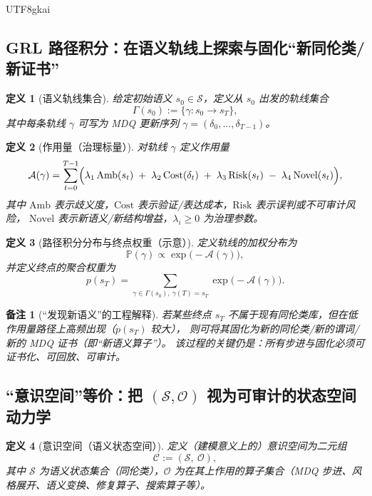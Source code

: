 \documentclass[12pt]{article}
\newtheorem{definition}{定义}[section]
\newtheorem{remark}{备注}[section]
\begin{document}
\begin{CJK*}{UTF8}{gkai}
\subsection{GRL 路径积分：在语义轨线上探索与固化“新同伦类/新证书”}
\label{subsec:grl-path-integral}

\begin{definition}[语义轨线集合]
给定初始语义 $s_0\in\mathcal{S}$，定义从 $s_0$ 出发的轨线集合
\[
\Gamma(s_0):=\{\gamma: s_0\to s_T\},
\]
其中每条轨线 $\gamma$ 可写为 MDQ 更新序列 $\gamma=(\delta_0,\ldots,\delta_{T-1})$。
\end{definition}

\begin{definition}[作用量（治理标量）]
对轨线 $\gamma$ 定义作用量
\[
\mathcal{A}(\gamma)=\sum_{t=0}^{T-1}\Bigl(
\lambda_1\,\mathrm{Amb}(s_t)
\;+\;
\lambda_2\,\mathrm{Cost}(\delta_t)
\;+\;
\lambda_3\,\mathrm{Risk}(s_t)
\;-\;
\lambda_4\,\mathrm{Novel}(s_t)
\Bigr),
\]
其中 $\mathrm{Amb}$ 表示歧义度，$\mathrm{Cost}$ 表示验证/表达成本，$\mathrm{Risk}$ 表示误判或不可审计风险，
$\mathrm{Novel}$ 表示新语义/新结构增益，$\lambda_i\ge 0$ 为治理参数。
\end{definition}

\begin{definition}[路径积分分布与终点权重（示意）]
定义轨线的加权分布为
\[
\mathbb{P}(\gamma)\propto \exp\bigl(-\mathcal{A}(\gamma)\bigr),
\]
并定义终点的聚合权重为
\[
p(s_T)=\sum_{\gamma\in\Gamma(s_0),\ \gamma(T)=s_T}\exp\bigl(-\mathcal{A}(\gamma)\bigr).
\]
\end{definition}

\begin{remark}[“发现新语义”的工程解释]
若某些终点 $s_T$ 不属于现有同伦类库，但在低作用量路径上高频出现（$p(s_T)$ 较大），
则可将其固化为新的同伦类/新的谓词/新的 MDQ 证书（即“新语义算子”）。
该过程的关键仍是：所有步进与固化必须可证书化、可回放、可审计。
\end{remark}

\subsection{“意识空间”等价：把 \texorpdfstring{$(\mathcal{S},\mathcal{O})$}{(S,O)} 视为可审计的状态空间动力学}
\label{subsec:consciousness-space-modeling}

\begin{definition}[意识空间（语义状态空间）]
定义（建模意义上的）意识空间为二元组
\[
\mathcal{C}:=(\mathcal{S},\ \mathcal{O}),
\]
其中 $\mathcal{S}$ 为语义状态集合（同伦类），$\mathcal{O}$ 为在其上作用的算子集合（MDQ 步进、风格展开、语义变换、修复算子、搜索算子等）。
\end{definition}


\end{CJK*}
\end{document}
